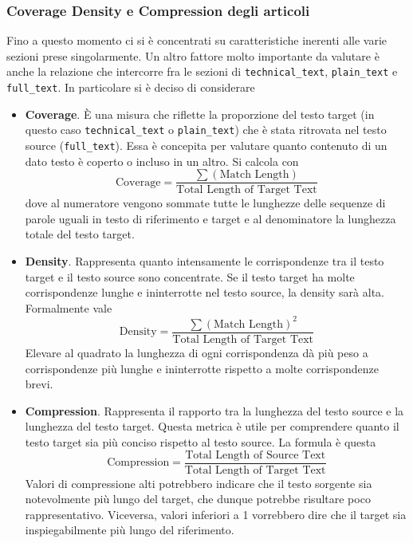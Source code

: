 \documentclass[12pt,a4paper,twoside,openright]{book}
\begin{document}
\subsubsection{Coverage Density e Compression degli articoli}
Fino a questo momento ci si è concentrati su caratteristiche inerenti alle varie sezioni prese singolarmente. Un altro fattore molto importante da valutare è anche la relazione che intercorre fra le sezioni di \texttt{technical\_text}, \texttt{plain\_text} e \texttt{full\_text}. In particolare si è deciso di considerare
\begin{itemize}
    \item \textbf{Coverage}. È una misura che riflette la proporzione del testo target (in questo caso \texttt{technical\_text} o \texttt{plain\_text}) che è stata ritrovata nel testo source (\texttt{full\_text}). Essa è concepita per valutare quanto contenuto di un dato testo è coperto o incluso in un altro. Si calcola con 
    \begin{equation*}
        \text{Coverage} = \frac{\sum (\text{Match Length})}{\text{Total Length of Target Text}}
    \end{equation*}
    dove al numeratore vengono sommate tutte le lunghezze delle sequenze di parole uguali in testo di riferimento e target e al denominatore la lunghezza totale del testo target.
    \item \textbf{Density}. Rappresenta quanto intensamente le corrispondenze tra il testo target e il testo source sono concentrate. Se il testo target ha molte corrispondenze lunghe e ininterrotte nel testo source, la density sarà alta. Formalmente vale
    \begin{equation*}
        \text{Density} = \frac{\sum (\text{Match Length})^2}{\text{Total Length of Target Text}}
    \end{equation*}
    Elevare al quadrato la lunghezza di ogni corrispondenza dà più peso a corrispondenze più lunghe e ininterrotte rispetto a molte corrispondenze brevi.
    \item \textbf{Compression}. Rappresenta il rapporto tra la lunghezza del testo source e la lunghezza del testo target. Questa metrica è utile per comprendere quanto il testo target sia più conciso rispetto al testo source. La formula è questa
    \begin{equation*}
        \text{Compression} = \frac{\text{Total Length of Source Text}}{\text{Total Length of Target Text}}
    \end{equation*}
    Valori di compressione alti potrebbero indicare che il testo sorgente sia notevolmente più lungo del target, che dunque potrebbe risultare poco rappresentativo. Viceversa, valori inferiori a 1 vorrebbero dire che il target sia inspiegabilmente più lungo del riferimento.
\end{itemize}
\end{document}
